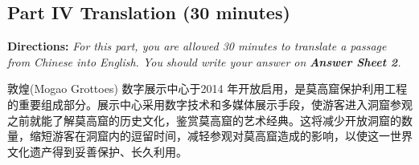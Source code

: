 \documentclass[UTF8,11pt]{ctexart}
\begin{document}
\subsection*{\textbf{Part IV Translation (30 minutes)}}


\textbf{Directions: }\textit{For this part, you are allowed 30 minutes to translate a passage from Chinese into English. You} \textit{should write your answer on }\textbf{\textit{Answer Sheet 2}}\textit{.}


敦煌(Mogao Grottoes) 数字展示中心于2014 年开放启用，是莫高窟保护利用工程的重要组成部分。展示中心采用数字技术和多媒体展示手段，使游客进入洞窟参观之前就能了解莫高窟的历史文化，鉴赏莫高窟的艺术经典。这将减少开放洞窟的数量，缩短游客在洞窟内的逗留时间，减轻参观对莫高窟造成的影响，以使这一世界文化遗产得到妥善保护、长久利用。
\end{document}
